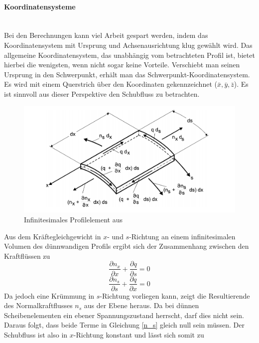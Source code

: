 \paragraph{Koordinatensysteme}~\\
Bei den Berechnungen kann viel Arbeit gespart werden, indem das Koordinatensystem mit Ursprung und Achsenausrichtung klug gewählt wird. Das allgemeine Koordinatensystem, das unabhängig vom betrachteten Profil ist, bietet hierbei die wenigsten, wenn nicht sogar keine Vorteile. Verschiebt man seinen Ursprung in den Schwerpunkt, erhält man das Schwerpunkt-Koordinatensystem. Es wird mit einem Querstrich über den Koordinaten gekennzeichnet ($\bar{x},\bar{y},\bar{z}$). Es ist sinnvoll aus dieser Perspektive den Schubfluss zu betrachten.
\begin{figure}[h]
	\centering
	\includegraphics[width=1\textwidth]{Bilder/schubfluss-infinit}
	\caption{Infinitesimales Profilelement aus \cite{item15}}
	\label{schubfluss-infinit}
\end{figure}
Aus dem Kräftegleichgewicht in $x$- und $s$-Richtung an einem infinitesimalen Volumen des dünnwandigen Profils ergibt sich der Zusammenhang zwischen den Kraftflüssen zu
\begin{equation}
	\frac{\partial n_x}{\partial x} + \frac{\partial q}{\partial s} = 0
\end{equation}
\begin{equation}\label{n_s}
\frac{\partial n_s}{\partial s} + \frac{\partial q}{\partial x} = 0
\end{equation}
Da jedoch eine Krümmung in $s$-Richtung vorliegen kann, zeigt die Resultierende des Normalkraftflusses $n_s$ aus der Ebene heraus. Da bei dünnen Scheibenelementen ein ebener Spannungszustand herrscht, darf dies nicht sein. Daraus folgt, dass beide Terme in Gleichung \ref{n_s} gleich null sein müssen. Der Schubfluss ist also in $x$-Richtung konstant und lässt sich somit zu
